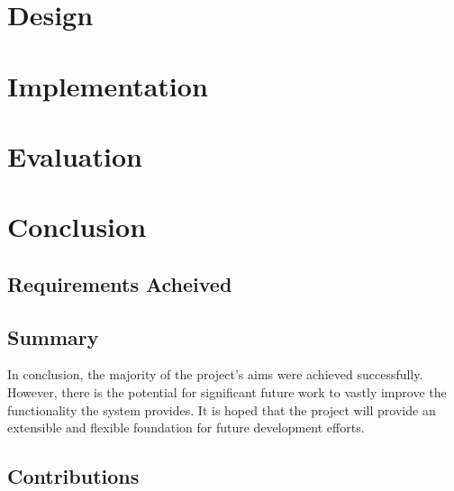 \documentclass{l3proj}
\begin{document}
\chapter{Design}
\label{design}




\chapter{Implementation}
\label{implementation}




\chapter{Evaluation}
\label{evaluation}




\chapter{Conclusion}
\label{conclusion}

\section{Requirements Acheived}




\section{Summary}
In conclusion, the majority of the project's aims were achieved successfully.
However, there is the potential for significant future work to vastly improve the functionality the system provides.
It is hoped that the project will provide an extensible and flexible foundation for future development efforts.

\section{Contributions}
\label{contributions}
\end{document}
